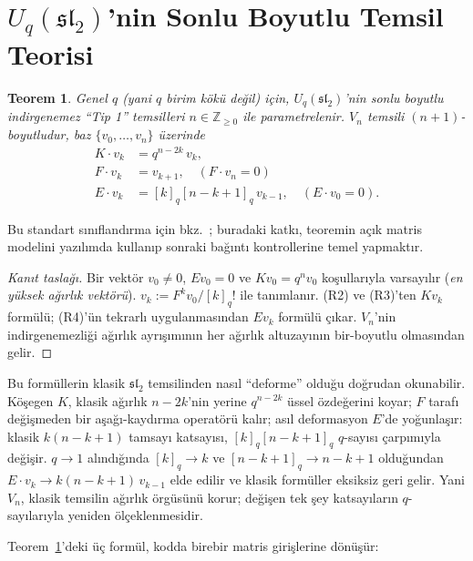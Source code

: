 \documentclass[10pt]{math}
\numberwithin{equation}{section}
\theoremstyle{plain}
\newtheorem{theorem}{Teorem}[section]
\theoremstyle{definition}
\renewcommand{\sl}{\mathfrak{sl}}
\newcommand{\Uq}{U_q(\sl_2)}
\newcommand{\Z}{\mathbb{Z}}
\newcommand{\qint}[1]{[#1]_q}
\newcommand{\qfact}[1]{[#1]_q!}
\begin{document}
\section{$\Uq$'nin Sonlu Boyutlu Temsil Teorisi}

\begin{theorem}\label{thm:irreps}
Genel $q$ (yani $q$ birim kökü değil) için, $\Uq$'nin sonlu boyutlu
indirgenemez ``Tip 1'' temsilleri $n \in \Z_{\geq 0}$ ile parametrelenir.
$V_n$ temsili $(n+1)$-boyutludur, baz $\{v_0, \dots, v_n\}$ üzerinde
\begin{align}
  K \cdot v_k &= q^{n - 2k}\, v_k, \\
  F \cdot v_k &= v_{k+1}, \quad (F \cdot v_n = 0) \\
  E \cdot v_k &= \qint{k} \qint{n - k + 1}\, v_{k-1}, \quad (E \cdot v_0 = 0).
\end{align}
\end{theorem}

Bu standart sınıflandırma için bkz.\ \cite{Kassel,ChariPressley,Lusztig};
buradaki katkı, teoremin açık matris modelini yazılımda kullanıp sonraki
bağıntı kontrollerine temel yapmaktır.

\begin{proof}[Kanıt taslağı]
Bir vektör $v_0 \neq 0$, $E v_0 = 0$ ve $K v_0 = q^n v_0$ koşullarıyla
varsayılır (\emph{en yüksek ağırlık vektörü}). $v_k := F^k v_0 / \qfact{k}$
ile tanımlanır. (R2) ve (R3)'ten $K v_k$ formülü; (R4)'ün tekrarlı
uygulanmasından $E v_k$ formülü çıkar. $V_n$'nin indirgenemezliği
ağırlık ayrışımının her ağırlık altuzayının bir-boyutlu olmasından
gelir.
\end{proof}

Bu formüllerin klasik $\sl_2$ temsilinden nasıl ``deforme'' olduğu doğrudan
okunabilir. Köşegen $K$, klasik ağırlık $n-2k$'nin yerine $q^{n-2k}$ üssel
özdeğerini koyar; $F$ tarafı değişmeden bir aşağı-kaydırma operatörü kalır;
asıl deformasyon $E$'de yoğunlaşır: klasik $k(n-k+1)$ tamsayı katsayısı,
$\qint{k}\qint{n-k+1}$ $q$-sayısı çarpımıyla değişir. $q\to 1$ alındığında
$\qint{k}\to k$ ve $\qint{n-k+1}\to n-k+1$ olduğundan $E\cdot v_k \to
k(n-k+1)\,v_{k-1}$ elde edilir ve klasik formüller eksiksiz geri gelir. Yani
$V_n$, klasik temsilin ağırlık örgüsünü korur; değişen tek şey katsayıların
$q$-sayılarıyla yeniden ölçeklenmesidir.

Teorem~\ref{thm:irreps}'deki üç formül, kodda birebir matris girişlerine
dönüşür:
\end{document}
